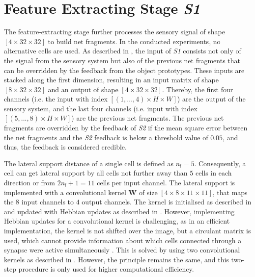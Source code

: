 \section{Feature Extracting Stage \emph{S1}}
The feature-extracting stage further processes the sensory signal of shape $[4 \times 32 \times 32]$ to build net fragments. In the conducted experiments, no alternative cells are used. As described in , the input of \emph{S1} consists not only of the signal from the sensory system but also of the previous net fragments that can be overridden by the feedback from the object prototypes.
These inputs are stacked along the first dimension, resulting in an input matrix of shape $[8 \times 32 \times 32]$ and an output of shape $[4 \times 32 \times 32]$.
Thereby, the first four channels (i.e. the input with index $[(1, ..., 4) \times H \times W]$) are the output of the sensory system, and the last four channels (i.e. input with index $[(5, ..., 8) \times H \times W]$) are the previous net fragments.
The previous net fragments are overridden by the feedback of \emph{S2} if the mean square error between the net fragments and the \emph{S2} feedback is below a threshold value of $0.05$, and thus, the feedback is considered credible.

The lateral support distance of a single cell is defined as $n_l=5$. Consequently, a cell can get lateral support by all cells not further away than $5$ cells in each direction or from $2n_l+1=11$ cells per input channel.
The lateral support is implemented with a convolutional kernel $\boldsymbol{W}$ of size $[4 \times 8 \times 11 \times 11]$, that maps the $8$ input channels to $4$ output channels.
The kernel is initialised as described in  and updated with Hebbian updates as described in .
However, implementing Hebbian updates for a convolutional kernel is challenging, as in an efficient implementation, the kernel is not shifted over the image, but a circulant matrix is used, which cannot provide information about which cells connected through a synapse were active simultaneously . This is solved by using two convolutional kernels as described in . However, the principle remains the same, and this two-step procedure is only used for higher computational efficiency.

